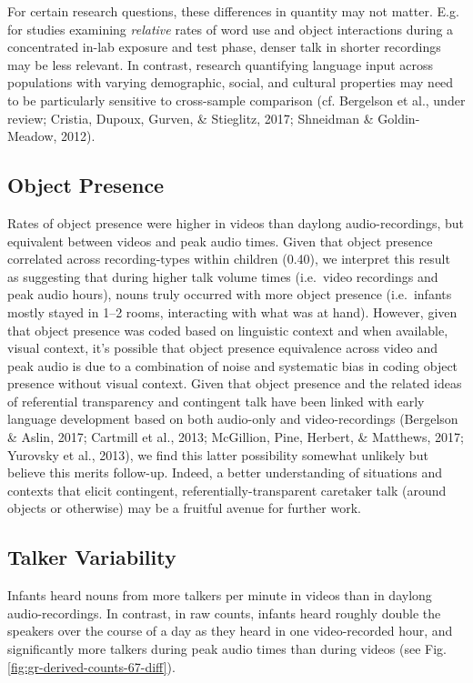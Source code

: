 \documentclass[man]{apa6}
\theoremstyle{definition}
\theoremstyle{definition}
\theoremstyle{definition}
\theoremstyle{remark}
\begin{document}
For certain research questions, these differences in quantity may not
matter. E.g. for studies examining \emph{relative} rates of word use and
object interactions during a concentrated in-lab exposure and test
phase, denser talk in shorter recordings may be less relevant. In
contrast, research quantifying language input across populations with
varying demographic, social, and cultural properties may need to be
particularly sensitive to cross-sample comparison (cf. Bergelson et al.,
under review; Cristia, Dupoux, Gurven, \& Stieglitz, 2017; Shneidman \&
Goldin-Meadow, 2012).

\subsection{Object Presence}\label{object-presence}

Rates of object presence were higher in videos than daylong
audio-recordings, but equivalent between videos and peak audio times.
Given that object presence correlated across recording-types within
children (0.40), we interpret this result as suggesting that during
higher talk volume times (i.e.~video recordings and peak audio hours),
nouns truly occurred with more object presence (i.e.~infants mostly
stayed in 1--2 rooms, interacting with what was at hand). However, given
that object presence was coded based on linguistic context and when
available, visual context, it's possible that object presence
equivalence across video and peak audio is due to a combination of noise
and systematic bias in coding object presence without visual context.
Given that object presence and the related ideas of referential
transparency and contingent talk have been linked with early language
development based on both audio-only and video-recordings (Bergelson \&
Aslin, 2017; Cartmill et al., 2013; McGillion, Pine, Herbert, \&
Matthews, 2017; Yurovsky et al., 2013), we find this latter possibility
somewhat unlikely but believe this merits follow-up. Indeed, a better
understanding of situations and contexts that elicit contingent,
referentially-transparent caretaker talk (around objects or otherwise)
may be a fruitful avenue for further work.

\subsection{Talker Variability}\label{talker-variability}

Infants heard nouns from more talkers per minute in videos than in
daylong audio-recordings. In contrast, in raw counts, infants heard
roughly double the speakers over the course of a day as they heard in
one video-recorded hour, and significantly more talkers during peak
audio times than during videos (see Fig.
\ref{fig:gr-derived-counts-67-diff}).
\end{document}

